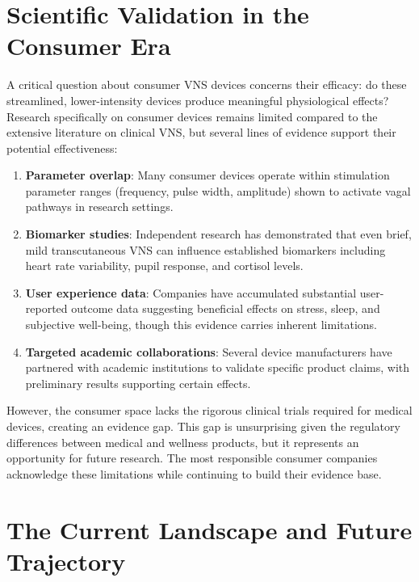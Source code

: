 \documentclass[
  Letterpaper,
]{scrbook}
\begin{document}
\section{Scientific Validation in the Consumer
Era}\label{scientific-validation-in-the-consumer-era}

A critical question about consumer VNS devices concerns their efficacy:
do these streamlined, lower-intensity devices produce meaningful
physiological effects? Research specifically on consumer devices remains
limited compared to the extensive literature on clinical VNS, but
several lines of evidence support their potential effectiveness:

\begin{enumerate}
\def\labelenumi{\arabic{enumi}.}
\item
  \textbf{Parameter overlap}: Many consumer devices operate within
  stimulation parameter ranges (frequency, pulse width, amplitude) shown
  to activate vagal pathways in research settings.
\item
  \textbf{Biomarker studies}: Independent research has demonstrated that
  even brief, mild transcutaneous VNS can influence established
  biomarkers including heart rate variability, pupil response, and
  cortisol levels.
\item
  \textbf{User experience data}: Companies have accumulated substantial
  user-reported outcome data suggesting beneficial effects on stress,
  sleep, and subjective well-being, though this evidence carries
  inherent limitations.
\item
  \textbf{Targeted academic collaborations}: Several device
  manufacturers have partnered with academic institutions to validate
  specific product claims, with preliminary results supporting certain
  effects.
\end{enumerate}

However, the consumer space lacks the rigorous clinical trials required
for medical devices, creating an evidence gap. This gap is unsurprising
given the regulatory differences between medical and wellness products,
but it represents an opportunity for future research. The most
responsible consumer companies acknowledge these limitations while
continuing to build their evidence base.

\section{The Current Landscape and Future
Trajectory}\label{the-current-landscape-and-future-trajectory}
\end{document}
